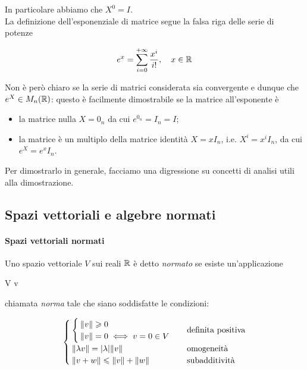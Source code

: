 In particolare abbiamo che $ X^{0} = I $.\\
La definizione dell'esponenziale di matrice segue la falsa riga delle serie di potenze

\begin{equation}
	e^{x} = \sum_{i=0}^{+\infty} \dfrac{x^{i}}{i!} \qcomma x \in \R
\end{equation}

Non è però chiaro se la serie di matrici considerata sia convergente e dunque che $ e^{X} \in M_{n}(\mathbb{R}) $: questo è facilmente dimostrabile se la matrice all'esponente è

\begin{itemize}
	\item la matrice nulla $ X = 0_{n} $ da cui $ e^{0_{n}} = I_{n} = I $;
	
	\item la matrice è un multiplo della matrice identità $ X = x I_{n} $, i.e. $ X^{i} = x^{i} I_{n} $, da cui $ e^{X} = e^{x} I_{n} $.
\end{itemize}

Per dimostrarlo in generale, facciamo una digressione su concetti di analisi utili alla dimostrazione.

\subsection{Spazi vettoriali e algebre normati}

\paragraph{Spazi vettoriali normati}

Uno spazio vettoriale $ V $ sui reali $ \mathbb{R} $ è detto \textit{normato} se esiste un'applicazione

\map{\norm{\cdot}}
	{V}{\R}
	{v}{}

chiamata \textit{norma} tale che siano soddisfatte le condizioni:

\begin{equation}
	\begin{cases}
		\begin{cases}
			\norm{v} \geqslant 0 \\
			\norm{v} = 0 \iff v = 0 \in V
		\end{cases} & \text{definita positiva} \\
		\norm{\lambda v} = \abs{\lambda} \norm{v} & \text{omogeneità} \\
		\norm{v + w} \leqslant \norm{v} + \norm{w} & \text{subadditività}
	\end{cases}
\end{equation}

